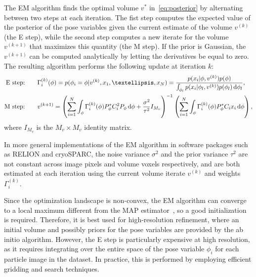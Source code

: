 \documentclass{article}
\begin{document}
The EM algorithm finds the optimal volume $v^*$ in~\eqref{eq:posterior} by alternating 
between two steps at each iteration. The fist step computes the expected value of 
the posterior of the pose variables given the current estimate 
of the volume $v^{(k)}$ (the E step), while the second step computes a new 
iterate for the volume $v^{(k+1)}$ that maximizes this quantity (the M step).
If the prior is Gaussian, the $v^{(k+1)}$ can be computed analytically by letting
the derivatives be equal to zero. 
The resulting algorithm performs the following update at iteration $k$:
\begin{subequations}
\begin{align}
    \text{E step:} &\qquad
    \Gamma_{i}^{(k)}(\phi) = p(\phi_i = \phi | v^{(k)}, x_1, \ldots, x_N)
    =\frac{
        p(x_i | \phi, v^{(k)}) p(\phi)
    }{
        \int_{\phi_l} p(x_i | \phi_l, v^{(k)}) p(\phi_l) \dif \phi_l
    },
    \label{eq:em gamma}
    \\
    \text{M step:} &\qquad
    v^{(k+1)} = 
    \left(
        \sum_{i=1}^N \int_{\phi} \Gamma_{i}^{(k)}(\phi)
        P_{\phi}^* C_i^2 P_{\phi} \dif\phi
        + \frac{\sigma^2}{\tau^2} I_{M_v}
    \right)^{-1}
    \left(
        \sum_{i=1}^N \int_{\phi} \Gamma_{i}^{(k)}(\phi)
        P_{\phi}^* C_i x_i \dif\phi
    \right),
    \label{eq:em v}
\end{align}
\end{subequations}
where $I_{M_v}$ is the $M_v \times M_v$ identity matrix.

In more general implementations of the EM algorithm in software packages such 
as RELION and cryoSPARC, the noise variance $\sigma^2$ and the prior variance 
$\tau^2$ are not constant across image pixels and volume voxels respectively, and 
are both estimated at each iteration using the current volume iterate $v^{(k)}$ 
and weights $\Gamma_i^{(k)}$.

Since the optimization landscape is non-convex, the EM algorithm can converge to 
a local maximum different from the MAP estimator~\cite{dempster_maximum_1977}, 
so a good initialization is required.
Therefore, it is best used for high-resolution refinement, where an initial volume 
and possibly priors for the pose variables are provided by the ab initio algorithm. 
However, the E step is particularly expensive at high resolution, as it requires 
integrating over the entire space of the pose variable $\phi_i$ for each particle 
image in the dataset. 
In practice, this is performed by employing efficient gridding and search techniques.
\end{document}
